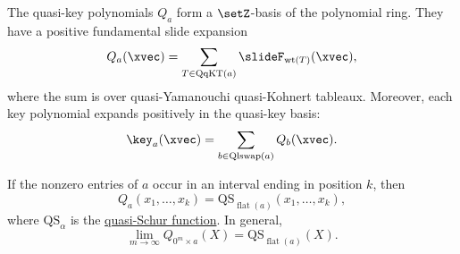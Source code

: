 \begin{theorem}
The quasi-key polynomials \(Q_a\) form a \(\setZ\)-basis of the polynomial
ring. 
They have a positive fundamental slide expansion
\[
 Q_a(\xvec)
 =
 \sum_{T \in \mathrm{QqKT}(a)}
 \slideF_{\operatorname{wt}(T)}(\xvec),
\]
where the sum is over quasi-Yamanouchi quasi-Kohnert tableaux.
Moreover, each key polynomial expands positively in the quasi-key basis:
\[
 \key_a(\xvec)
 =
 \sum_{b\in \mathrm{Qlswap}(a)}
 Q_b(\xvec).
\]
\end{theorem}

\begin{theorem}
If the nonzero entries of \(a\) occur in an interval ending in position
\(k\), then
\[
 Q_a(x_1,\dotsc,x_k)
 =
 \mathrm{QS}_{\operatorname{flat}(a)}(x_1,\dotsc,x_k),
\]
where \(\mathrm{QS}_{\alpha}\) is the
\hyperref[quasiSchurFunctions]{quasi-Schur function}.
In general,
\[
 \lim_{m\to\infty} Q_{0^m\times a}(X)
 =
 \mathrm{QS}_{\operatorname{flat}(a)}(X).
\]
\end{theorem}
